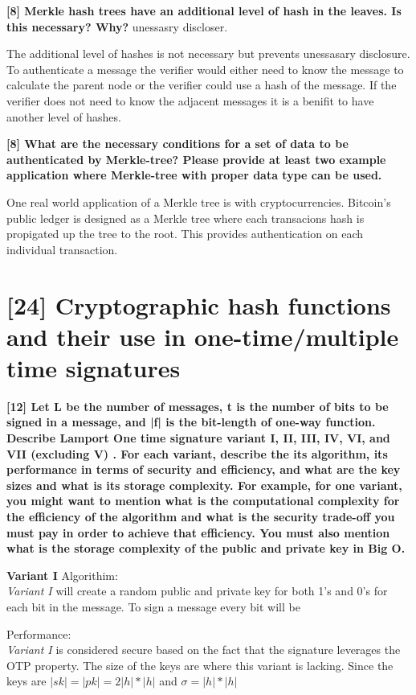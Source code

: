 \documentclass[letterpaper,11pt,notitlepage,fleqn]{article}
\begin{document}
\noindent \textbf{[8] Merkle hash trees have an additional level of hash in the leaves. Is this necessary? Why?}
unessasry discloser.

The additional level of hashes is not necessary but prevents unessasary disclosure. To authenticate a message the verifier would either need to know the message to calculate the parent node or the verifier could use a hash of the message. If the verifier does not need to know the adjacent messages it is a benifit to have another level of hashes. 

\noindent \textbf{[8] What are the necessary conditions for a set of data to be authenticated by Merkle-tree? Please provide at least two example application where Merkle-tree with proper data type can be used.}

One real world application of a Merkle tree is with cryptocurrencies. Bitcoin's public ledger is designed as a Merkle tree where each transacions hash is propigated up the tree to the root. This provides authentication on each individual transaction.

\section{[24] Cryptographic hash functions and their use in one-time/multiple time signatures}

\noindent \textbf{[12] Let L be the number of messages, t is the number of bits to be signed in a message, and |f| is the bit-length of one-way function. Describe Lamport One time signature variant I, II, III, IV, VI, and VII (excluding V) . For each variant, describe the its algorithm, its performance in terms of security and efficiency,  and what are the key sizes and what is its storage complexity. For example, for one variant, you might want to mention what is the computational complexity for the
efficiency  of the algorithm and what is the security trade-off you must pay in order to achieve that efficiency. You must also mention what is the storage complexity of the public and private key in Big O.} 

\textbf{Variant I}
\noindent Algorithim:\\
\indent \textit{Variant I} will create a random public and private key for both 1's and 0's for each bit in the message. To sign a message every bit will be 

\noindent Performance:\\
\indent \textit{Variant I} is considered secure based on the fact that the signature leverages the OTP property. The size of the keys are where this variant is lacking. Since the keys are $|sk|=|pk|=2|h|\ast|h|$ and $\sigma = |h|\ast|h|$ \\
\end{document}
